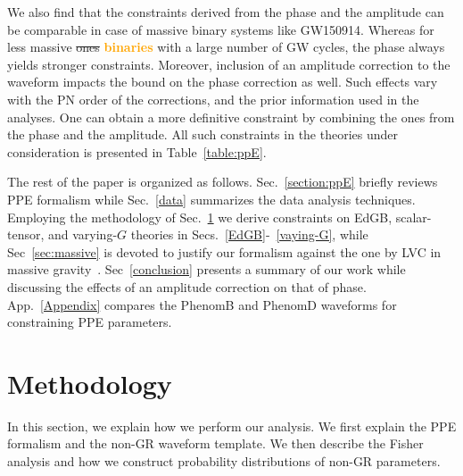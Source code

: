 \documentclass[prd,twocolumn,nofootinbib]{revtex4-1}
\newcommand{\zack}[1]{\textcolor{orange}{\textbf{#1}} }
\begin{document}
We also find that the constraints derived from the phase and the amplitude can be comparable in case of massive binary systems like GW150914. Whereas for less massive \sout{ones} \zack{binaries} with a large number of GW cycles, the phase always yields stronger constraints. Moreover, inclusion of an amplitude correction to the waveform impacts the bound on the phase correction as well.  Such effects vary with the PN order of the corrections, and the prior information used in the analyses. One can obtain a more definitive constraint by combining the ones from the phase and the amplitude. All such constraints in the theories under consideration is presented in Table~\ref{table:ppE}.


The rest of the paper is organized as follows. Sec.~\ref{section:ppE} briefly reviews PPE formalism while Sec.~\ref{data} summarizes the data analysis techniques. Employing the methodology of Sec.~\ref{section:method} we derive constraints on EdGB, scalar-tensor, and varying-$G$ theories in Secs.~\ref{EdGB}-~\ref{vaying-G}, while Sec~\ref{sec:massive} is devoted to justify our formalism against the one by LVC in massive gravity~\cite{TheLIGOScientific:2016src}. Sec~\ref{conclusion} presents a summary of our work while discussing the effects of an amplitude correction on that of phase. App.~\ref{Appendix} compares the PhenomB and PhenomD waveforms for constraining PPE parameters.



\section{Methodology}\label{section:method}

In this section, we explain how we perform our analysis. We first explain the PPE formalism and the non-GR waveform template. We then describe the Fisher analysis and how we construct probability distributions of non-GR parameters.

\end{document}
